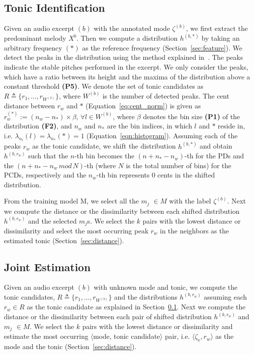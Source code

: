 \documentclass{sig-alternate}
\begin{document}
\subsection{Tonic Identification}\label{sec:tonic}

Given an audio excerpt $(b)$ with the annotated mode $\zeta^{(b)}$, we first extract the predominant melody $X^{b}$. Then we compute a distribution $h^{(b, *)}$ by taking an arbitrary frequency $(*)$ as the reference frequency (Section~\ref{sec:feature}). We detect the peaks in the distribution using the method explained in~\cite{smith1987parshl}. The peaks indicate the stable pitches performed in the excerpt. We only consider the peaks, which have a ratio between its height and the maxima of the distribution above a constant threshold {\bf (P5)}. We denote the set of tonic candidates as $R \triangleq \{r_1, \dots, r_{W^{(b)}}\}$, where $W^{(b)}$ is the number of detected peaks. The cent distance between $r_w$ and $*$ (Equation~\ref{eq:cent_norm}) is given as $r_w^{(*)} := \left(n_w - n_*\right) \times \beta,\,\forall l \in W^{(b)}$, where $\beta$ denotes the bin size {\bf (P1)} of the distribution {\bf (F2)}, and $n_w$ and $n_*$ are the bin indices, in which $l$ and $*$ reside in, i.e. $\lambda_{n_{l}}(l) = \lambda_{n_{*}}(*) = 1$ (Equation~\ref{eqn:histogram}). Assuming each of the peaks $r_w$ as the tonic candidate, we shift the distribution $h^{(b, *)}$ and obtain $h^{(b, r_w)}$ such that the $n$-th bin becomes the $(n + n_* - n_w)$-th for the PDs and the $(n + n_* - n_w \, mod \, N)$-th (where $N$ is the total number of bins) for the PCDs, respectively and the $n_w$-{th} bin represents $0$ cents in the shifted distribution.

From the training model M, we select all the $m_j$ $\in M$ with the label $\zeta^{(b)}$. Next we compute the distance or the dissimilarity between each shifted distribution $h^{(b, r_w)}$ and the selected $m_j$s. We select the $k$ pairs with the lowest distance or dissimilarity and select the most occurring peak $r_w$ in the neighbors as the estimated tonic (Section~\ref{sec:distance}).

\subsection{Joint Estimation}\label{sec:joint}
Given an audio excerpt $(b)$ with unknown mode and tonic, we compute the tonic candidates, $R \triangleq \{r_1, \dots, r_{W^{(b)}}\}$ and the distributions $h^{(b, r_w)}$ assuming each $r_w \in R$ as the tonic candidate as explained in Section~\ref{sec:tonic}. Next we compute the distance or the dissimilarity between each pair of shifted distribution $h^{(b, r_w)}$ and $m_j$ $\in M$. We select the $k$ pairs with the lowest distance or dissimilarity and estimate the most occurring $\langle$mode, tonic candidate$\rangle$ pair, i.e.  $\langle \zeta_v, r_w \rangle$ as the mode and the tonic (Section~\ref{sec:distance}).
\end{document}
